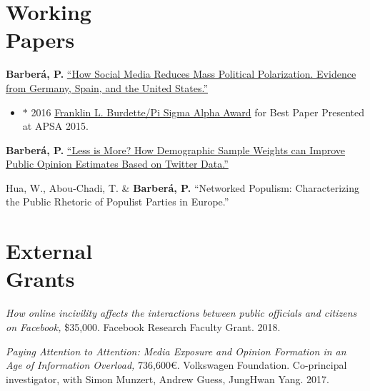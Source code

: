 \documentclass[margin,line,11pt]{resume}
\begin{document}
\begin{resume}
    \section{\mysidestyle Working\\Papers} 

\textbf{Barber\'{a}, P.} \href{http://www.pablobarbera.com/static/barbera_polarization_APSA.pdf}{``How Social Media Reduces Mass Political Polarization. Evidence from Germany, Spain, and the United States.''} 
\begin{itemize}
\item[] $\ast$ 2016 \href{http://www.apsanet.org/PROGRAMS/APSA-Awards/Franklin-L-Burdette-Pi-Sigma-Alpha-Award}{Franklin L. Burdette/Pi Sigma Alpha Award} for Best Paper Presented at APSA 2015.
\end{itemize}  

\textbf{Barber\'{a}, P.} \href{http://pablobarbera.com/static/less-is-more.pdf}{``Less is More? How Demographic Sample Weights can Improve Public Opinion Estimates Based on Twitter Data.''}


Hua, W., Abou-Chadi, T. \& \textbf{Barber\'{a}, P.} ``Networked Populism: Characterizing the Public Rhetoric of
Populist Parties in Europe.''






        \section{\mysidestyle External \\ Grants}
        
\textit{How online incivility affects the interactions between public officials and citizens on Facebook,} \$35,000. Facebook Research Faculty Grant. 2018.        
        
\textit{Paying Attention to Attention: Media Exposure and Opinion Formation in an Age of Information Overload,} 736,600\euro. Volkswagen Foundation. Co-principal investigator, with Simon Munzert, Andrew Guess, JungHwan Yang. 2017.


\end{resume}
\end{document}
